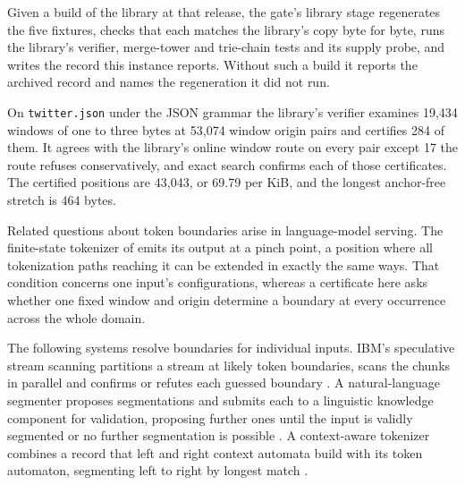 \documentclass[11pt,a4paper]{article}
\theoremstyle{definition}
\theoremstyle{plain}
\newcommand{\code}[1]{\texttt{#1}}
\begin{document}
Given a build of the library at that release, the gate's library stage regenerates the five fixtures, checks that each
matches the library's copy byte for byte, runs the library's verifier, merge-tower and trie-chain tests and its supply
probe, and writes the record this instance reports. Without such a build it reports the archived record and names the
regeneration it did not run.

On \code{twitter.json} under the JSON grammar the library's verifier examines 19{,}434 windows of one to three bytes at
53{,}074 window origin pairs and certifies 284 of them. It agrees with the library's online window route on every pair
except 17 the route refuses conservatively, and exact search confirms each of those certificates. The certified
positions are 43{,}043, or 69.79 per KiB, and the longest anchor-free stretch is 464 bytes.

Related questions about token boundaries arise in language-model serving. The finite-state tokenizer of
\citet{kaplan1998tokenizing} emits its output at a pinch point, a position where all tokenization paths reaching it can
be extended in exactly the same ways. That condition concerns one input's configurations, whereas a certificate here
asks whether one fixed window and origin determine a boundary at every occurrence across the whole domain.

The following systems resolve boundaries for individual inputs. IBM's speculative stream scanning partitions a stream at
likely token boundaries, scans the chunks in parallel and confirms or refutes each guessed boundary
\citep{vonpraun2011speculative}. A natural-language segmenter proposes segmentations and submits each to a linguistic
knowledge component for validation, proposing further ones until the input is validly segmented or no further
segmentation is possible \citep{pentheroudakis2006tokenizer}. A context-aware tokenizer combines a record that left and
right context automata build with its token automaton, segmenting left to right by longest match
\citep{walther2003context}.
\end{document}
